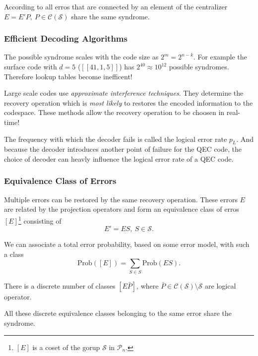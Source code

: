 According to \cite{QECmemory} all erros that are connected by an element of the centralizer $E=E'P,\ P \in \mathcal{C}(\mathcal{S})$ share the same syndrome.


\subsubsection{Efficient Decoding Algorithms}
The possible syndrome scales with the code size as $2^m = 2^{n-k}$.
For example the surface code with $d=5$ ($[[41,1,5]]$) has $2^{40}\approx 10^{12}$ possible syndromes. 
Therefore lookup tables become inefficent! \cite{QECintro}

Large scale codes use \textit{approximate interference techniques}.
They determine the recovery operation which is \textit{most likely} to restores the encoded information to the codespace.
These methods allow the recovery operation to be choosen in real-time! \cite{QECintro}

The frequency with which the decoder fails is called the logical error rate $p_L$. 
And because the decoder introduces another point of failure for the QEC code, the choice of decoder can heavly influence the logical error rate of a QEC code.  \cite{QECintro}


\subsubsection{Equivalence Class of Errors}
Multiple errors can be restored by the same recovery operation.
These errors $E$ are related by the projection operators and form an equivalence class of erros $[E]$\footnote{
    $[E]$ is a coset of the gorup $\mathcal{S}$ in $\mathcal{P}_n$. 
} consisting of
\begin{equation}
    E' = ES, \  S \in \mathcal{S}.
\end{equation}

We can associate a total error probability, based on some error model, with such a class 
\begin{equation}
    \text{Prob}([E]) = \sum_{S\in S} \text{Prob}(ES).
\end{equation}

There is a discrete number of classes $[E\bar{P}]$, where $\bar{P}\in \mathcal{C}(\mathcal{S}) \setminus \mathcal{S}$ are logical operator. \cite{QECmemory}

All these discrete equivalence classes belonging to the same error share the syndrome. 


